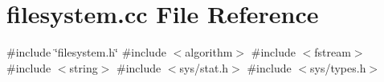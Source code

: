 \section{filesystem.\+cc File Reference}
\label{filesystem_8cc}
{\ttfamily \#include \char`\"{}filesystem.\+h\char`\"{}}\newline
{\ttfamily \#include $<$algorithm$>$}\newline
{\ttfamily \#include $<$fstream$>$}\newline
{\ttfamily \#include $<$string$>$}\newline
{\ttfamily \#include $<$sys/stat.\+h$>$}\newline
{\ttfamily \#include $<$sys/types.\+h$>$}\newline
